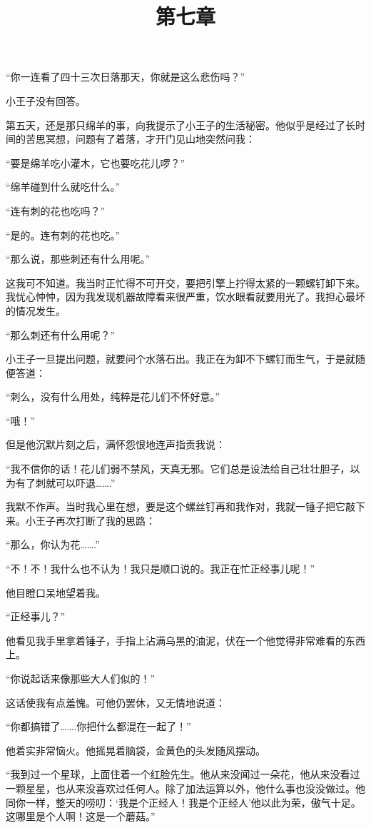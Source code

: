 “你一连看了四十三次日落那天，你就是这么悲伤吗？”

小王子没有回答。

\title{第七章}

第五天，还是那只绵羊的事，向我提示了小王子的生活秘密。他似乎是经过了长时间的苦思冥想，问题有了着落，才开门见山地突然问我：

“要是绵羊吃小灌木，它也要吃花儿啰？”

“绵羊碰到什么就吃什么。”

“连有刺的花也吃吗？”

“是的。连有刺的花也吃。”

“那么说，那些刺还有什么用呢。”

这我可不知道。我当时正忙得不可开交，要把引擎上拧得太紧的一颗螺钉卸下来。我忧心忡忡，因为我发现机器故障看来很严重，饮水眼看就要用光了。我担心最坏的情况发生。

“那么刺还有什么用呢？”

小王子一旦提出问题，就要问个水落石出。我正在为卸不下螺钉而生气，于是就随便答道：

“刺么，没有什么用处，纯粹是花儿们不怀好意。”

“哦！”

但是他沉默片刻之后，满怀怨恨地连声指责我说：

“我不信你的话！花儿们弱不禁风，天真无邪。它们总是设法给自己壮壮胆子，以为有了刺就可以吓退\ldots{}\ldots{}.”

我默不作声。当时我心里在想，要是这个螺丝钉再和我作对，我就一锤子把它敲下来。小王子再次打断了我的思路：

“那么，你认为花\ldots{}\ldots{}.”

“不！不！我什么也不认为！我只是顺口说的。我正在忙正经事儿呢！”

他目瞪口呆地望着我。

“正经事儿？”

他看见我手里拿着锤子，手指上沾满乌黑的油泥，伏在一个他觉得非常难看的东西上。

“你说起话来像那些大人们似的！”

这话使我有点羞愧。可他仍罢休，又无情地说道：

“你都搞错了\ldots{}\ldots{}.你把什么都混在一起了！”

他着实非常恼火。他摇晃着脑袋，金黄色的头发随风摆动。

“我到过一个星球，上面住着一个红脸先生。他从来没闻过一朵花，他从来没看过一颗星星，也从来没喜欢过任何人。除了加法运算以外，他什么事也没没做过。他同你一样，整天的唠叨：‘我是个正经人！我是个正经人'他以此为荣，傲气十足。这哪里是个人啊！这是一个蘑菇。”

